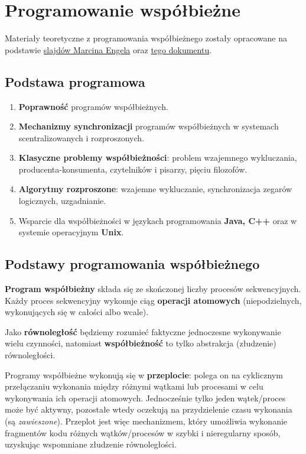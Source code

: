 \chapter{Programowanie współbieżne}

Materiały teoretyczne z programowania współbieżnego zostały opracowane na podstawie \href{https://drive.google.com/file/d/1zfBfwprD5GQxga15WCi90tR3eM1Ihmwb/view?usp=sharing}{slajdów Marcina Engela} oraz \href{https://drive.google.com/file/d/1uXtmLBMIz4NsdsGUeBw0uWAQerDOgUyB/view?usp=sharing}{tego dokumentu}.

\section*{Podstawa programowa}
\begin{enumerate}
    \item \textbf{Poprawność} programów współbieżnych.
    \item \textbf{Mechanizmy synchronizacji} programów współbieżnych w systemach scentralizowanych i rozproszonych.
    \item \textbf{Klasyczne problemy współbieżności}: problem wzajemnego wykluczania, producenta-konsumenta, czytelników i pisarzy, pięciu filozofów.
    \item \textbf{Algorytmy rozproszone}: wzajemne wykluczanie, synchronizacja zegarów logicznych, uzgadnianie.
    \item Wsparcie dla współbieżności w językach programowania \textbf{Java, C++} oraz w systemie operacyjnym \textbf{Unix}.
\end{enumerate}

\section{Podstawy programowania współbieżnego}

\textbf{Program współbieżny} składa się ze skończonej liczby procesów sekwencyjnych. Każdy proces sekwencyjny wykonuje ciąg \textbf{operacji atomowych} (niepodzielnych, wykonujących się w całości albo wcale).

Jako \textbf{równoległość} będziemy rozumieć faktyczne jednoczesne wykonywanie wielu czynności, natomiast \textbf{współbieżność} to tylko abstrakcja (złudzenie) równoległości.

Programy współbieżne wykonują się w \textbf{przeplocie}: polega on na cyklicznym przełączaniu wykonania między różnymi wątkami lub procesami w celu wykonywania ich operacji atomowych. Jednocześnie tylko jeden wątek/proces może być aktywny, pozostałe wtedy oczekują na przydzielenie czasu wykonania (są \textit{zawieszone}). Przeplot jest więc mechanizmem, który umożliwia wykonanie fragmentów kodu różnych wątków/procesów w szybki i nieregularny sposób, uzyskując wspomniane złudzenie równoległości.

